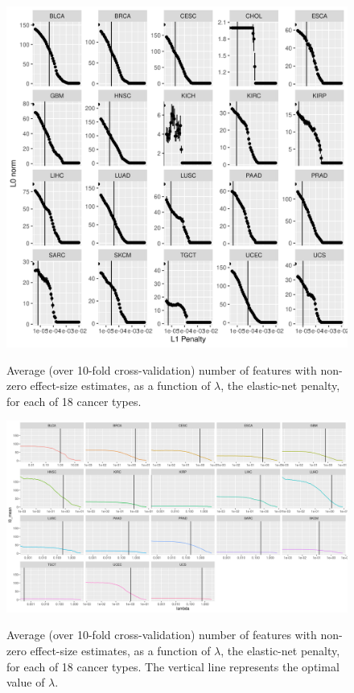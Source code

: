 \begin{figure}
    \centering
    \includegraphics[width=.9\linewidth]{img/cv_l0.png}
    \label{fig:cv_l0}
    \caption{Average (over 10-fold cross-validation) number of features with non-zero effect-size estimates, as a function of $\lambda$, the elastic-net penalty, for each of 18 cancer types.}
\end{figure}

\begin{figure}
    \centering
    \includegraphics[width=.9\linewidth]{img/enet_cv_l0.png}
    \label{fig:enet_cv_l0}
    \caption{Average (over 10-fold cross-validation) number of features with non-zero effect-size estimates, as a function of $\lambda$, the elastic-net penalty, for each of 18 cancer types.  The vertical line
    represents the optimal value of $\lambda$.}
\end{figure}

 
 

% 

